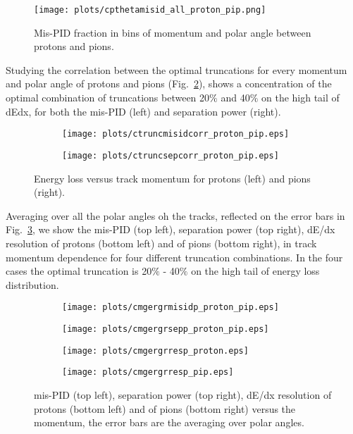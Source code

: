 \begin{figure}[H]
    \centering
    \texttt{[image: plots/cpthetamisid\_all\_proton\_pip.png]}
    \caption{\label{fig.3.6}Mis-PID fraction in bins of momentum and polar angle between protons and pions.}
\end{figure}
Studying the correlation between the optimal truncations for every momentum and polar angle of protons and pions (Fig.~\ref{fig.3.7}), shows a concentration of the optimal combination of truncations between 20$\%$ and 40$\%$ on the high tail of dEdx, for both the mis-PID (left) and separation power (right).
\begin{figure}[H]
    \centering
    \begin{subfigure}[b]{0.45\textwidth}
        \texttt{[image: plots/ctruncmisidcorr\_proton\_pip.eps]}
    \end{subfigure}\hfill
    \begin{subfigure}[b]{0.45\textwidth}
        \texttt{[image: plots/ctruncsepcorr\_proton\_pip.eps]}
    \end{subfigure}
    \caption{Energy loss versus track momentum for protons (left) and pions (right).}
    \label{fig.3.7}
\end{figure}
Averaging over all the polar angles oh the tracks, reflected on the error bars in Fig.~\ref{fig.3.8}, we show the mis-PID (top left), separation power (top right), dE/dx resolution of protons (bottom left) and of pions (bottom right), in track momentum dependence for four different truncation combinations. In the four cases the optimal truncation is 20$\%$ - 40$\%$ on the high tail of energy loss distribution.
\begin{figure}[H]
    \centering
    \begin{subfigure}[b]{0.45\textwidth}
        \texttt{[image: plots/cmgergrmisidp\_proton\_pip.eps]}
    \end{subfigure}\hfill
    \begin{subfigure}[b]{0.45\textwidth}
        \texttt{[image: plots/cmgergrsepp\_proton\_pip.eps]}
    \end{subfigure}\hfill
    \begin{subfigure}[b]{0.45\textwidth}
        \texttt{[image: plots/cmgergrresp\_proton.eps]}
    \end{subfigure}\hfill
    \begin{subfigure}[b]{0.45\textwidth}
        \texttt{[image: plots/cmgergrresp\_pip.eps]}
    \end{subfigure}
    \caption{mis-PID (top left), separation power (top right), dE/dx resolution of protons (bottom left) and of pions (bottom right) versus the momentum, the error bars are the averaging over polar angles.}
    \label{fig.3.8}
\end{figure}

